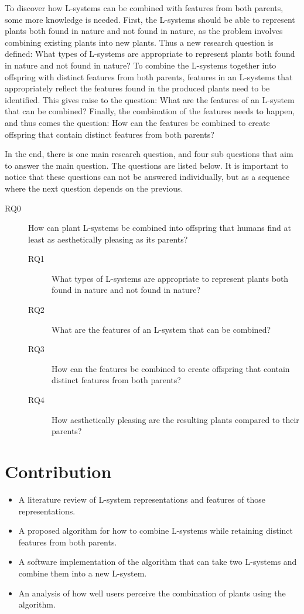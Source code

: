 To discover how L-systems can be combined with features from both parents, some more knowledge is needed.
First, the L-systems should be able to represent plants both found in nature and not found in nature, as the problem involves combining existing plants into new plants.
Thus a new research question is defined: What types of L-systems are appropriate to represent plants both found in nature and not found in nature?
To combine the L-systems together into offspring with distinct features from both parents, features in an L-systems that appropriately reflect the features found in the produced plants need to be identified.
This gives raise to the question: What are the features of an L-system that can be combined?
Finally, the combination of the features needs to happen, and thus comes the question: How can the features be combined to create offspring that contain distinct features from both parents?

In the end, there is one main research question, and four sub questions that aim to answer the main question.
The questions are listed below.
It is important to notice that these questions can not be answered individually, but as a sequence where the next question depends on the previous.

\begin{description}
    \item[RQ0] How can plant L-systems be combined into offspring that humans find at least as aesthetically pleasing as its parents?
    \begin{description}
        \item[RQ1] What types of L-systems are appropriate to represent plants both found in nature and not found in nature?
        \item[RQ2] What are the features of an L-system that can be combined?
        \item[RQ3] How can the features be combined to create offspring that contain distinct features from both parents?
        \item[RQ4] How aesthetically pleasing are the resulting plants compared to their parents?
    \end{description}
\end{description}

\section{Contribution}
\begin{itemize}
    \item A literature review of L-system representations and features of those representations.
    \item A proposed algorithm for how to combine L-systems while retaining distinct features from both parents.
    \item A software implementation of the algorithm that can take two L-systems and combine them into a new L-system.
    \item An analysis of how well users perceive the combination of plants using the algorithm.
\end{itemize}
